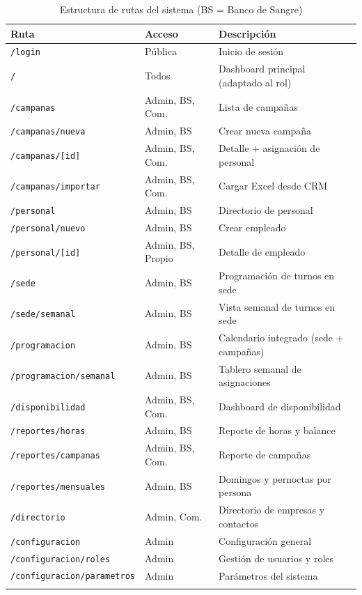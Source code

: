 \documentclass[10pt,a4paper]{article}
\begin{document}
\begin{longtable}{|p{5cm}|p{3.5cm}|p{5.5cm}|}
\hline
\textbf{Ruta} & \textbf{Acceso} & \textbf{Descripci\'{o}n} \\
\hline
\endhead
\texttt{/login} & P\'{u}blica & Inicio de sesi\'{o}n \\
\hline
\texttt{/} & Todos & Dashboard principal (adaptado al rol) \\
\hline
\texttt{/campanas} & Admin, BS, Com. & Lista de campañas \\
\hline
\texttt{/campanas/nueva} & Admin, BS & Crear nueva campaña \\
\hline
\texttt{/campanas/[id]} & Admin, BS, Com. & Detalle + asignaci\'{o}n de personal \\
\hline
\texttt{/campanas/importar} & Admin, BS, Com. & Cargar Excel desde CRM \\
\hline
\texttt{/personal} & Admin, BS & Directorio de personal \\
\hline
\texttt{/personal/nuevo} & Admin, BS & Crear empleado \\
\hline
\texttt{/personal/[id]} & Admin, BS, Propio & Detalle de empleado \\
\hline
\texttt{/sede} & Admin, BS & Programaci\'{o}n de turnos en sede \\
\hline
\texttt{/sede/semanal} & Admin, BS & Vista semanal de turnos en sede \\
\hline
\texttt{/programacion} & Admin, BS & Calendario integrado (sede + campañas) \\
\hline
\texttt{/programacion/semanal} & Admin, BS & Tablero semanal de asignaciones \\
\hline
\texttt{/disponibilidad} & Admin, BS, Com. & Dashboard de disponibilidad \\
\hline
\texttt{/reportes/horas} & Admin, BS & Reporte de horas y balance \\
\hline
\texttt{/reportes/campanas} & Admin, BS, Com. & Reporte de campañas \\
\hline
\texttt{/reportes/mensuales} & Admin, BS & Domingos y pernoctas por persona \\
\hline
\texttt{/directorio} & Admin, Com. & Directorio de empresas y contactos \\
\hline
\texttt{/configuracion} & Admin & Configuraci\'{o}n general \\
\hline
\texttt{/configuracion/roles} & Admin & Gesti\'{o}n de usuarios y roles \\
\hline
\texttt{/configuracion/parametros} & Admin & Par\'{a}metros del sistema \\
\hline
\caption{Estructura de rutas del sistema (BS = Banco de Sangre)}
\end{longtable}
\end{document}
